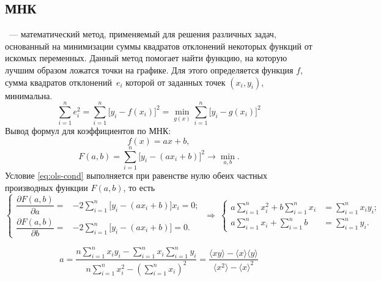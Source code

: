 \subsection{МНК}
~--- математический метод, применяемый для решения различных задач, основанный на минимизации суммы квадратов отклонений некоторых функций от искомых переменных. Данный метод помогает найти функцию, на которую лучшим образом ложатся точки на графике. Для этого определяется функция $f$, сумма квадратов отклонений~$e_i$ которой от заданных точек $\left( x_i, y_i \right)$, минимальна.
\begin{equation}
\sum\limits_{i=1}^n e_i^2 = \sum\limits_{i=1}^n \bigl[ y_i - f(x_i) \bigr]^2 = \min_{g(x)} \sum\limits_{i=1}^n \bigl[y_i - g(x_i) \bigr]^2
\label{eq:ols-cond}
\end{equation}
Вывод формул для коэффициентов  по МНК:
\begin{equation*}
f(x) = ax + b,
\end{equation*}
\begin{equation*}
F(a,b) = \sum\limits_{i=1}^n \bigl[y_i-(ax_i + b) \bigr]^2 \rightarrow \min_{a, b}.
\end{equation*}
Условие \eqref{eq:ols-cond} выполняется при равенстве нулю обеих частных производных функции $F(a, b)$, то есть
\begin{equation*}
\left\{ \begin{aligned}
\dfrac{\partial  F(a,b)}{\partial a} =& -2\sum\limits_{i=1}^n \bigl[ y_i-(ax_i + b) \bigr] x_i = 0;\\
\dfrac{\partial  F(a,b)}{\partial b} =& -2\sum\limits_{i=1}^n \bigl[ y_i-(ax_i + b) \bigr] = 0.
\end{aligned} \right. ~\Longrightarrow~
\left\{ \begin{aligned}
a \sum\limits_{i=1}^n x_i^2 + b \sum\limits_{i=1}^n x_i &= \sum\limits_{i=1}^n x_i y_i;\\
 a\sum\limits_{i=1}^n x_i + \sum\limits_{i=1}^n b &= \sum\limits_{i=1}^n y_i.
\end{aligned} \right.
\end{equation*}

\begin{equation}
a = \dfrac{n\sum\limits_{i=1}^n x_i y_i - \sum\limits_{i=1}^n x_i \sum\limits_{i=1}^n y_i}{n \sum\limits_{i=1}^n x_i^2 - \left(\sum\limits_{i=1}^n x_i\right)^2} 
= \dfrac{\langle xy \rangle -\langle x\rangle \langle y \rangle}{\langle x^2 \rangle - \langle x \rangle^2}
\end{equation}

